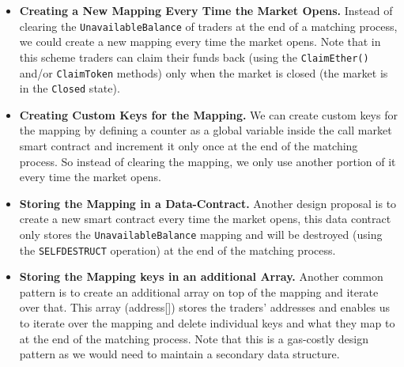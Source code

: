 \begin{itemize}

\item \textbf{Creating a New Mapping Every Time the Market Opens.} Instead of clearing the \texttt{UnavailableBalance} of traders at the end of a matching process, we could create a new mapping every time the market opens. Note that in this scheme traders can claim their funds back (using the \texttt{ClaimEther()} and/or \texttt{ClaimToken} methods) only when the market is closed (\ie the market is in the \texttt{Closed} state).

\item \textbf{Creating Custom Keys for the Mapping.} We can create custom keys for the mapping by defining a counter as a global variable inside the call market smart contract and increment it only once at the end of the matching process. So instead of clearing the mapping, we only use another portion of it every time the market opens.

\item \textbf{Storing the Mapping in a Data-Contract.} Another design proposal is to create a new smart contract every time the market opens, this data contract only stores the \texttt{UnavailableBalance} mapping and will be destroyed (using the \texttt{SELFDESTRUCT} operation) at the end of the matching process.

\item \textbf{Storing the Mapping keys in an additional Array.} Another common pattern is to create an additional array on top of the mapping and iterate over that. This array (\eg address[]) stores the traders' addresses and enables us to iterate over the mapping and delete individual keys and what they map to at the end of the matching process. Note that this is a gas-costly design pattern as we would need to maintain a secondary data structure. 

\end{itemize}




